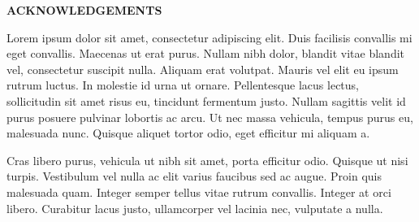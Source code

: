 \begin{center}
\textbf{ACKNOWLEDGEMENTS}
\end{center}


Lorem ipsum dolor sit amet, consectetur adipiscing elit. Duis facilisis convallis mi eget convallis. Maecenas ut erat purus. Nullam nibh dolor, blandit vitae blandit vel, consectetur suscipit nulla. Aliquam erat volutpat. Mauris vel elit eu ipsum rutrum luctus. In molestie id urna ut ornare. Pellentesque lacus lectus, sollicitudin sit amet risus eu, tincidunt fermentum justo. Nullam sagittis velit id purus posuere pulvinar lobortis ac arcu. Ut nec massa vehicula, tempus purus eu, malesuada nunc. Quisque aliquet tortor odio, eget efficitur mi aliquam a.

Cras libero purus, vehicula ut nibh sit amet, porta efficitur odio. Quisque ut nisi turpis. Vestibulum vel nulla ac elit varius faucibus sed ac augue. Proin quis malesuada quam. Integer semper tellus vitae rutrum convallis. Integer at orci libero. Curabitur lacus justo, ullamcorper vel lacinia nec, vulputate a nulla.